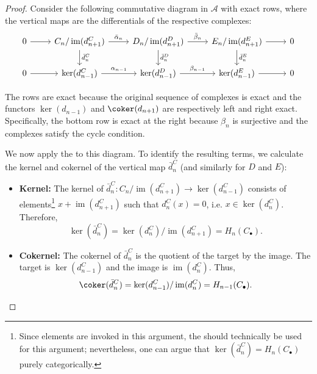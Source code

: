 \begin{proof}
Consider the following commutative diagram in $\mathcal{A}$ with exact rows, where the vertical maps are the differentials of the respective complexes:
\begin{equation} \label{eq:snake_setup}
\begin{tikzcd}
0 \ar[r] & C_n / \operatorname{im}(d_{n+1}^C) \ar[r, "\bar{\alpha}_n"] \ar[d, "\bar{d}_n^C"] & D_n / \operatorname{im}(d_{n+1}^D) \ar[r, "\bar{\beta}_n"] \ar[d, "\bar{d}_n^D"] & E_n / \operatorname{im}(d_{n+1}^E) \ar[r] \ar[d, "\bar{d}_n^E"] & 0 \\
0 \ar[r] & \ker(d_{n-1}^C) \ar[r, "\alpha_{n-1}"] & \ker(d_{n-1}^D) \ar[r, "\beta_{n-1}"] & \ker(d_{n-1}^E) \ar[r] & 0
\end{tikzcd}
\end{equation}

The rows are exact because the original sequence of complexes is exact and the functors $\ker(d_{n-1})$ and $\coker(d_{n+1})$ are respectively left and right exact. Specifically, the bottom row is exact at the right because $\beta_n$ is surjective and the complexes satisfy the cycle condition. 

We now apply the  to this diagram. To identify the resulting terms, we calculate the kernel and cokernel of the vertical map $\bar{d}_n^C$ (and similarly for $D$ and $E$):
\begin{itemize}
    \item \textbf{Kernel:} The kernel of $\bar{d}_n^C: C_n / \operatorname{im}(d_{n+1}^C) \to \ker(d_{n-1}^C)$ consists of elements\footnote{Since elements are invoked in this argument, the  should technically be used for this argument; nevertheless, one can argue that $\ker(\bar{d}_n^C) = H_n(C_\bullet)$ purely categorically.} $x + \operatorname{im}(d_{n+1}^C)$ such that $d_n^C(x) = 0$, i.e. $x \in \ker(d_n^C)$. Therefore,
    \[ \ker(\bar{d}_n^C) = \ker(d_n^C) / \operatorname{im}(d_{n+1}^C) = H_n(C_\bullet). \]
    
    \item \textbf{Cokernel:} The cokernel of $\bar{d}_n^C$ is the quotient of the target by the image. The target is $\ker(d_{n-1}^C)$ and the image is $\operatorname{im}(d_n^C)$. Thus,
    \[ \coker(\bar{d}_n^C) = \ker(d_{n-1}^C) / \operatorname{im}(d_n^C) = H_{n-1}(C_\bullet). \]
\end{itemize}


\end{proof}
